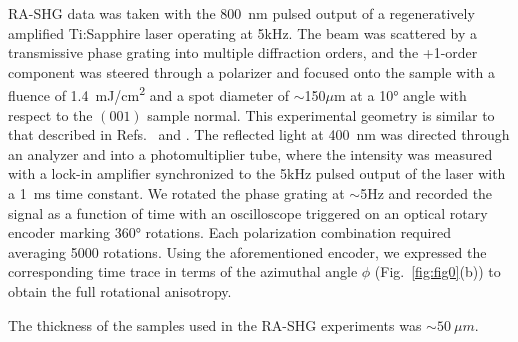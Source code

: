 RA-SHG data was taken with the \qty{800}{\nm} pulsed output of a regeneratively amplified Ti:Sapphire laser operating at 5kHz.
The beam was scattered by a transmissive phase grating into multiple diffraction orders, and the +1-order component was steered through a polarizer and focused onto the sample with a fluence of \qty{1.4}{mJ/cm^2} and a spot diameter of $\sim$150$\mu$m at a \ang{10} angle with respect to the $(001)$ sample normal.
This experimental geometry is similar to that described in Refs.~ and .
The reflected light at \qty{400}{\nm} was directed through an analyzer and into a photomultiplier tube, where the intensity was measured with a lock-in amplifier synchronized to the 5kHz pulsed output of the laser with a \qty{1}{\ms} time constant.
We rotated the phase grating at $\sim$5Hz and recorded the signal as a function of time with an oscilloscope triggered on an optical rotary encoder marking \ang{360} rotations.
Each polarization combination required averaging 5000 rotations.
Using the aforementioned encoder, we expressed the corresponding time trace in terms of the azimuthal angle $\phi$ (Fig.~\ref{fig:fig0}(b)) to obtain the full rotational anisotropy.

The thickness of the samples used in the RA-SHG experiments was $\sim\qty{50}{\mu m}$.

